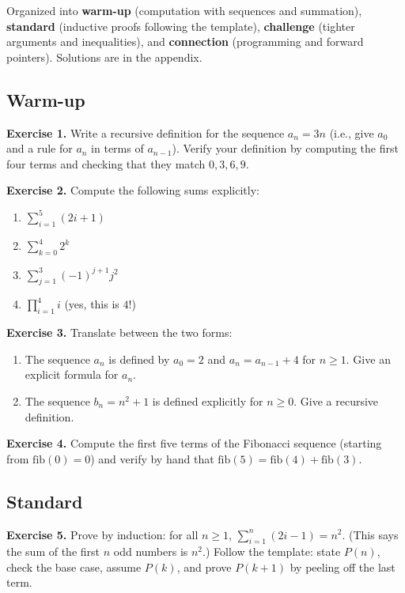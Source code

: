 \documentclass[11pt]{article}
\begin{document}
Organized into \textbf{warm-up} (computation with sequences and summation), \textbf{standard} (inductive proofs following the template), \textbf{challenge} (tighter arguments and inequalities), and \textbf{connection} (programming and forward pointers). Solutions are in the appendix.

\subsection*{Warm-up}

\textbf{Exercise 1.}\label{ex:m8:1} Write a recursive definition for the sequence $a_n = 3n$ (i.e., give $a_0$ and a rule for $a_n$ in terms of $a_{n-1}$). Verify your definition by computing the first four terms and checking that they match $0, 3, 6, 9$.

\bigskip
\textbf{Exercise 2.}\label{ex:m8:2} Compute the following sums explicitly:
\begin{enumerate}[label=(\alph*)]
  \item $\displaystyle\sum_{i=1}^{5} (2i + 1)$
  \item $\displaystyle\sum_{k=0}^{4} 2^k$
  \item $\displaystyle\sum_{j=1}^{3} (-1)^{j+1} j^2$
  \item $\displaystyle\prod_{i=1}^{4} i$ (yes, this is $4!$)
\end{enumerate}

\bigskip
\textbf{Exercise 3.}\label{ex:m8:3} Translate between the two forms:
\begin{enumerate}[label=(\alph*)]
  \item The sequence $a_n$ is defined by $a_0 = 2$ and $a_n = a_{n-1} + 4$ for $n \geq 1$. Give an explicit formula for $a_n$.
  \item The sequence $b_n = n^2 + 1$ is defined explicitly for $n \geq 0$. Give a recursive definition.
\end{enumerate}

\bigskip
\textbf{Exercise 4.}\label{ex:m8:4} Compute the first five terms of the Fibonacci sequence (starting from $\text{fib}(0) = 0$) and verify by hand that $\text{fib}(5) = \text{fib}(4) + \text{fib}(3)$.

\subsection*{Standard}

\textbf{Exercise 5.}\label{ex:m8:5} Prove by induction: for all $n \geq 1$, $\displaystyle\sum_{i=1}^{n} (2i - 1) = n^2$. (This says the sum of the first $n$ odd numbers is $n^2$.) Follow the template: state $P(n)$, check the base case, assume $P(k)$, and prove $P(k+1)$ by peeling off the last term.
\end{document}
